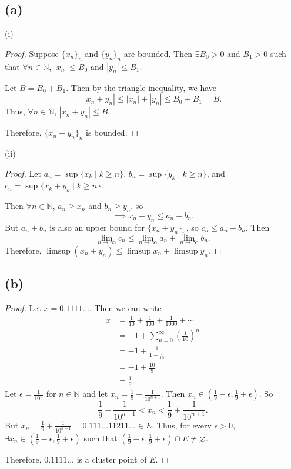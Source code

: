 \documentclass{article}
\newcommand{\N}{\mathbb{N}} %
\begin{document}
\subsection*{(a)}
(i) 
\begin{proof}
	Suppose $\{x_n\}_n$ and $\{y_n\}_n$ are bounded. Then $\exists B_0 > 0$ and $B_1 > 0$ such that $\forall n \in \N$, $|x_n| \leq B_0$ and $|y_n| \leq B_1$.
	
	Let $B = B_0 + B_1$. Then by the triangle inequality, we have
	\begin{equation}
		|x_n + y_n| \leq |x_n| + |y_n| \leq B_0 + B_1 = B.
	\end{equation}
	Thus, $\forall n \in \N$, $|x_n + y_n| \leq B$.
	
	Therefore, $\{x_n + y_n\}_n$ is bounded.
\end{proof}

(ii) 
\begin{proof}
	Let $a_n = \sup\{x_k \;|\; k\geq n\}$, $b_n = \sup\{y_k \;|\; k\geq n\}$, and \\$c_n = \sup\{x_k + y_k \;|\; k\geq n\}$.
	
	Then $\forall n \in \N$, $a_n \geq x_n$ and $b_n \geq y_n$, so
	\begin{equation}
		\implies x_n + y_n \leq a_n + b_n.
	\end{equation}
	But $a_n + b_n$ is also an upper bound for $\{x_n + y_n\}_n$, so $c_n \leq a_n + b_n$. Then
	\begin{equation}
		\lim_{n \to \infty} c_n \leq \lim_{n \to \infty} a_n + \lim_{n \to \infty} b_n.
	\end{equation}
	Therefore, $\limsup(x_n + y_n) \leq \limsup x_n + \limsup y_n$.
\end{proof}

\subsection*{(b)}
\begin{proof}
	Let $x=0.1111...$. Then we can write
	\begin{align}
		x &= \frac{1}{10} + \frac{1}{100} + \frac{1}{1000} + \cdots \\
		&= -1 + \sum_{n=0}^{\infty}\left(\frac{1}{10}\right)^n \\
		&= -1 + \frac{1}{1-\frac{1}{10}} \\
		&= -1 + \frac{10}{9} \\
		&= \frac{1}{9}.
	\end{align}
	Let $\epsilon = \frac{1}{10^n}$ for $n \in \N$ and let $x_n = \frac{1}{9} + \frac{1}{10^{n+1}}$. Then $x_n \in \left(\frac{1}{9}-\epsilon, \frac{1}{9} + \epsilon\right)$. So
	\begin{equation}
		\frac{1}{9} - \frac{1}{10^{n+1}} < x_n < \frac{1}{9} + \frac{1}{10^{n+1}}.
	\end{equation}
	But $x_n = \frac{1}{9} + \frac{1}{10^{n+1}} = 0.111...11211... \in E$. Thus, for every $\epsilon > 0$, \\$\exists x_n \in \left(\frac{1}{9}-\epsilon, \frac{1}{9}+\epsilon\right)$ such that $\left(\frac{1}{9}-\epsilon, \frac{1}{9}+\epsilon\right)\cap E \neq \varnothing$.
	
	Therefore, $0.1111...$ is a cluster point of $E$.
\end{proof}
\end{document}
